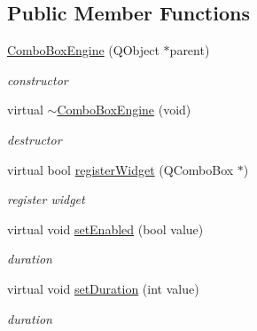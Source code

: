 \subsection*{Public Member Functions}
\begin{DoxyCompactItemize}
\item 
\mbox{\label{class_combo_box_engine_abd0fc3b7b582a1b81c9470d7ef7c6d8c}} 
\hyperlink{class_combo_box_engine_abd0fc3b7b582a1b81c9470d7ef7c6d8c}{Combo\+Box\+Engine} (Q\+Object $\ast$parent)
\begin{DoxyCompactList}\small\item\em constructor \end{DoxyCompactList}\item 
\mbox{\label{class_combo_box_engine_a86b621c3080fe0c5355e21c9a6057117}} 
virtual \hyperlink{class_combo_box_engine_a86b621c3080fe0c5355e21c9a6057117}{$\sim$\+Combo\+Box\+Engine} (void)
\begin{DoxyCompactList}\small\item\em destructor \end{DoxyCompactList}\item 
\mbox{\label{class_combo_box_engine_ae8354bc0be5bea43c51b038254ea3761}} 
virtual bool \hyperlink{class_combo_box_engine_ae8354bc0be5bea43c51b038254ea3761}{register\+Widget} (Q\+Combo\+Box $\ast$)
\begin{DoxyCompactList}\small\item\em register widget \end{DoxyCompactList}\item 
\mbox{\label{class_combo_box_engine_ad6930ae7a0673fecf9581e115f6fe430}} 
virtual void \hyperlink{class_combo_box_engine_ad6930ae7a0673fecf9581e115f6fe430}{set\+Enabled} (bool value)
\begin{DoxyCompactList}\small\item\em duration \end{DoxyCompactList}\item 
\mbox{\label{class_combo_box_engine_a3e989643d9039f80f71e55563ce09c52}} 
virtual void \hyperlink{class_combo_box_engine_a3e989643d9039f80f71e55563ce09c52}{set\+Duration} (int value)
\begin{DoxyCompactList}\small\item\em duration \end{DoxyCompactList}\end{DoxyCompactItemize}
